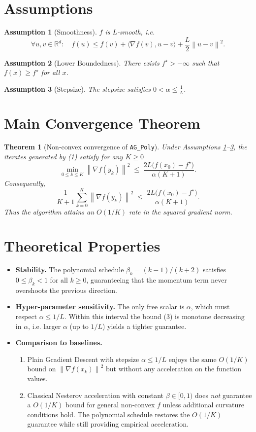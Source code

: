 \documentclass{article}
\newtheorem{theorem}{Theorem}
\newtheorem{assumption}{Assumption}
\newcommand{\norm}[1]{\left\|#1\right\|}
\newcommand{\inner}[2]{\langle #1,#2\rangle}
\begin{document}
\newpage
\section*{Assumptions}
\begin{assumption}[Smoothness]\label{as:smooth}
$f$ is $L$‑smooth, i.e.
\[
\forall u,v\in\mathbb{R}^{d}:\quad 
f(u)\le f(v)+\inner{\nabla f(v)}{u-v}+\frac{L}{2}\norm{u-v}^{2}.
\tag{2}
\]
\end{assumption}
\begin{assumption}[Lower Boundedness]\label{as:lb}
There exists $f^{\star}>-\infty$ such that $f(x)\ge f^{\star}$ for all $x$.
\end{assumption}
\begin{assumption}[Stepsize]\label{as:step}
The stepsize satisfies $0<\alpha\le \frac{1}{L}$.
\end{assumption}

\section*{Main Convergence Theorem}
\begin{theorem}[Non‑convex convergence of \texttt{AG\_Poly}]
\label{thm:main}
Under Assumptions \ref{as:smooth}–\ref{as:step}, the iterates generated by (1) satisfy for any $K\ge 0$
\[
\min_{0\le k\le K}\norm{\nabla f(y_{k})}^{2}
\;\le\;
\frac{2L\bigl(f(x_{0})-f^{\star}\bigr)}{\alpha(K+1)}.
\tag{3}
\]
Consequently,
\[
\frac{1}{K+1}\sum_{k=0}^{K}\norm{\nabla f(y_{k})}^{2}
\;\le\;
\frac{2L\bigl(f(x_{0})-f^{\star}\bigr)}{\alpha(K+1)}.
\tag{4}
\]
Thus the algorithm attains an $O(1/K)$ rate in the squared gradient norm.
\end{theorem}

\section*{Theoretical Properties}
\begin{itemize}[leftmargin=*]
\item \textbf{Stability.} The polynomial schedule $\beta_{k}=(k-1)/(k+2)$ satisfies $0\le\beta_{k}<1$ for all $k\ge0$, guaranteeing that the momentum term never overshoots the previous direction.
\item \textbf{Hyper‑parameter sensitivity.} The only free scalar is $\alpha$, which must respect $\alpha\le1/L$. Within this interval the bound (3) is monotone decreasing in $\alpha$, i.e. larger $\alpha$ (up to $1/L$) yields a tighter guarantee.
\item \textbf{Comparison to baselines.}
\begin{enumerate}
\item Plain Gradient Descent with stepsize $\alpha\le1/L$ enjoys the same $O(1/K)$ bound on $\norm{\nabla f(x_{k})}^{2}$ but without any acceleration on the function values.
\item Classical Nesterov acceleration with constant $\beta\in[0,1)$ does \emph{not} guarantee a $O(1/K)$ bound for general non‑convex $f$ unless additional curvature conditions hold. The polynomial schedule restores the $O(1/K)$ guarantee while still providing empirical acceleration.
\end{enumerate}
\end{itemize}
\end{document}
